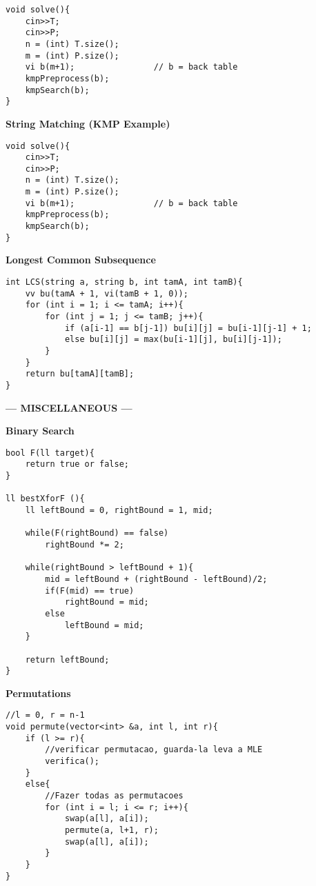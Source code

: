 \documentclass{article}
\begin{document}
\begin{multicols}{2}
\begin{lstlisting}
void solve(){
	cin>>T;
	cin>>P;
	n = (int) T.size();
	m = (int) P.size();
	vi b(m+1);                // b = back table
	kmpPreprocess(b);
	kmpSearch(b);
}
\end{lstlisting}

\large
\huge\textbf{String Matching (KMP Example)}
\large
\begin{lstlisting}
void solve(){
    cin>>T;
    cin>>P;
    n = (int) T.size();
    m = (int) P.size();
    vi b(m+1);                // b = back table
    kmpPreprocess(b);
    kmpSearch(b);
}
\end{lstlisting}

\large
\huge\textbf{Longest Common Subsequence}
\large
\begin{lstlisting}
int LCS(string a, string b, int tamA, int tamB){
	vv bu(tamA + 1, vi(tamB + 1, 0));
	for (int i = 1; i <= tamA; i++){
		for (int j = 1; j <= tamB; j++){
			if (a[i-1] == b[j-1]) bu[i][j] = bu[i-1][j-1] + 1;
			else bu[i][j] = max(bu[i-1][j], bu[i][j-1]);
		}
	}
	return bu[tamA][tamB];
}	
\end{lstlisting}

\large
\begin{center}
\huge\textbf{--- MISCELLANEOUS ---}
\end{center}
\large

\large
\huge\textbf{Binary Search}
\large
\begin{lstlisting}
bool F(ll target){
    return true or false;
}

ll bestXforF (){
    ll leftBound = 0, rightBound = 1, mid;
    
    while(F(rightBound) == false)
        rightBound *= 2;

    while(rightBound > leftBound + 1){
        mid = leftBound + (rightBound - leftBound)/2;
        if(F(mid) == true)
            rightBound = mid;
        else    
            leftBound = mid;
    }

    return leftBound;
}
\end{lstlisting}

\large
\huge\textbf{Permutations}
\large
\begin{lstlisting}
//l = 0, r = n-1
void permute(vector<int> &a, int l, int r){
	if (l >= r){
		//verificar permutacao, guarda-la leva a MLE
		verifica();
	}
	else{
		//Fazer todas as permutacoes
		for (int i = l; i <= r; i++){
			swap(a[l], a[i]);
			permute(a, l+1, r);
			swap(a[l], a[i]);
		}
	}
}
\end{lstlisting}

\end{multicols}
\end{document}
